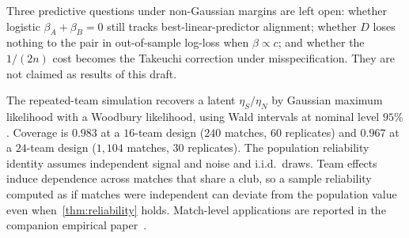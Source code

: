 Three predictive questions under non-Gaussian margins are left open: whether logistic $\beta_A+\beta_B=0$ still tracks best-linear-predictor alignment; whether $D$ loses nothing to the pair in out-of-sample log-loss when $\beta\propto c$; and whether the $1/(2n)$ cost becomes the Takeuchi correction under misspecification.
They are not claimed as results of this draft.

The repeated-team simulation recovers a latent $\eta_S/\eta_N$ by Gaussian maximum likelihood with a Woodbury likelihood, using Wald intervals at nominal level $95\%$.
Coverage is $0.983$ at a $16$-team design ($240$ matches, $60$ replicates) and $0.967$ at a $24$-team design ($1{,}104$ matches, $30$ replicates).
The population reliability identity assumes independent signal and noise and i.i.d.\ draws.
Team effects induce dependence across matches that share a club, so a sample reliability computed as if matches were independent can deviate from the population value even when~\cref{thm:reliability} holds.
Match-level applications are reported in the companion empirical paper~\parencite{brownPEFempirical}.
